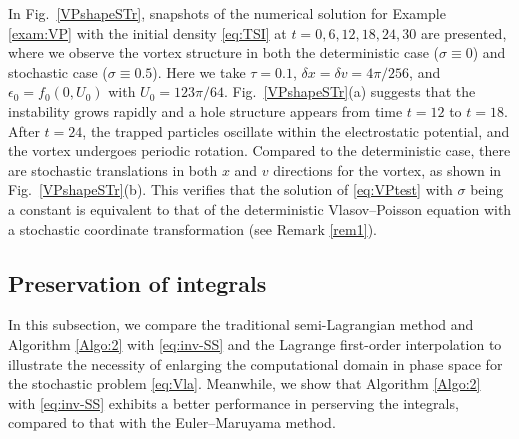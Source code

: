 \documentclass[11pt,reqno]{amsproc}
\numberwithin{equation}{section}
\begin{document}
In Fig.~\ref{VPshapeSTr},
snapshots of the numerical solution for Example \ref{exam:VP} with the initial density \eqref{eq:TSI} at $t= 0,6,12,18,24,30$ are presented, 
 where we observe the vortex structure in both the deterministic case ($\sigma\equiv 0$) and stochastic case ($\sigma\equiv 0.5$). Here we take $\tau = 0.1$, $ \delta x = \delta v = 4\pi/256$, and $\epsilon_0=f_0(0,U_0)$ with $U_0=123\pi/64$.
 Fig.~\ref{VPshapeSTr}(a) 
 suggests that the instability grows rapidly and a hole structure appears from time $t=12$ to $t=18$. After $t=24$, the trapped particles oscillate within the electrostatic potential, and the vortex undergoes periodic rotation. Compared to the deterministic case, there are stochastic translations in both $x$ and $v$ directions for the vortex, as shown in Fig.\ \ref{VPshapeSTr}(b).
 This verifies that the solution of \eqref{eq:VPtest} with $\sigma$ being a constant is equivalent to that of the deterministic Vlasov–Poisson equation with a stochastic coordinate transformation (see Remark \ref{rem1}).

\subsection{Preservation of integrals}\label{S5.3}
In this subsection, we compare the traditional semi-Lagrangian method and Algorithm \ref{Algo:2} with \eqref{eq:inv-SS} and the Lagrange first-order interpolation to illustrate the necessity of enlarging the computational domain in phase space for the stochastic problem \eqref{eq:Vla}.
Meanwhile, we show that 
 Algorithm \ref{Algo:2} with \eqref{eq:inv-SS} exhibits a better performance in perserving the integrals, compared to that with the Euler--Maruyama method.
 
\end{document}
